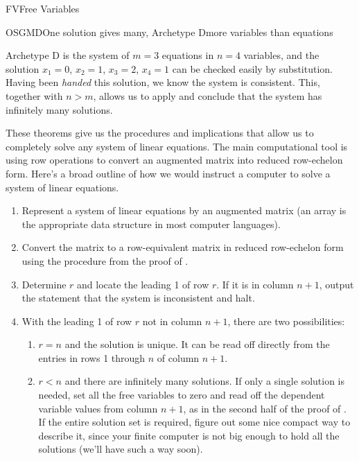 \begin{subsect}{FV}{Free Variables}
%
\begin{example}{OSGMD}{One solution gives many, Archetype D}{more variables than equations}
\begin{para}Archetype D is the system of $m=3$ equations in $n=4$ variables,
%
%
and the solution $x_1 = 0$, $x_2 = 1$, $x_3 = 2$, $x_4 = 1$ can be checked easily by substitution.  Having been {\em handed} this solution, we know the system is consistent.  This, together with $n>m$, allows us to apply  and conclude that the system has infinitely many solutions.
\end{para}
\end{example}
%
\begin{para}These theorems give us the procedures and implications that allow us to completely solve any system of linear equations.  The main computational tool is using row operations to convert an augmented matrix into reduced row-echelon form.  Here's a broad outline of how we would instruct a computer to solve  a system of linear equations.
%
\begin{enumerate}
\item  Represent a system of linear equations by an augmented matrix (an array is the appropriate data structure in most computer languages).
\item  Convert the matrix to a row-equivalent matrix in reduced row-echelon form using the procedure from the proof of .
\item  Determine $r$ and locate the leading 1 of row $r$.  If it is in column $n+1$, output the statement that the system is inconsistent and halt.
\item With the leading 1 of row $r$ not in column $n+1$, there are two possibilities:
\begin{enumerate}
\item $r=n$ and the solution is unique.  It can be read off directly from the entries in rows 1 through $n$ of column $n+1$.
\item
$r<n$ and there are infinitely many solutions.
If only a single solution is needed, set all the free variables to zero and read off the dependent variable values from column $n+1$, as in the second half of the proof of .  If the entire solution set is required, figure out some nice compact way to describe it, since your finite computer is not big enough to hold all the solutions (we'll have such a way soon).
\end{enumerate}
\end{enumerate}

\end{para}
\end{subsect}
